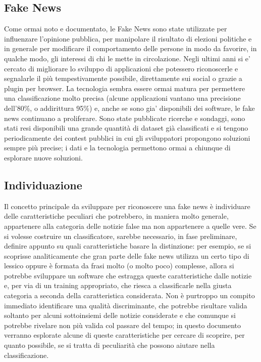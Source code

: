 \documentclass{article}
\begin{document}
    \begin{multicols}{2}
	    \section{Fake News}
			Come ormai noto e documentato, le Fake News sono state utilizzate per influenzare l'opinione pubblica, per manipolare il risultato di elezioni politiche e in generale per modificare il comportamento delle persone in modo da favorire, in qualche modo, gli interessi di chi le mette in circolazione.
			Negli ultimi anni si e' cercato di migliorare lo sviluppo di applicazioni che potessero riconoscerle e segnalarle il più tempestivamente possibile, direttamente sui social o grazie a plugin per browser. La tecnologia sembra essere ormai matura per permettere una classificazione molto precisa (alcune applicazioni vantano una precisione dell'80\%, o addirittura 95\%) \cite{fakenewschallenge} e, anche se sono gia' disponibili dei software, le fake news continuano a proliferare.
			Sono state pubblicate ricerche e sondaggi, sono stati resi disponibili una grande quantità di dataset già classificati e si tengono periodicamente dei contest pubblici in cui gli sviluppatori propongono soluzioni sempre più precise; i dati e la tecnologia permettono ormai a chiunque di esplorare nuove soluzioni.
			
			\subsection{Individuazione}
			Il concetto principale da sviluppare per riconoscere una fake news è individuare delle caratteristiche peculiari che potrebbero, in maniera molto generale, appartenere alla categoria delle notizie false ma non appartenere a quelle vere. Se si volesse costruire un classificatore, sarebbe necessario, in fase preliminare, definire appunto su quali caratteristiche basare la distinzione: per esempio, se si scoprisse analiticamente che gran parte delle fake news utilizza un certo tipo di lessico oppure è formata da frasi molto (o molto poco) complesse, allora si potrebbe sviluppare un software che estragga queste caratteristiche dalle notizie e, per via di un training appropriato, che riesca a classificarle nella giusta categoria a seconda della caratteristica considerata.
			Non è purtroppo un compito immediato identificare una qualità discriminante, che potrebbe risultare valida soltanto per alcuni sottoinsiemi delle notizie considerate e che comunque si potrebbe rivelare non più valida col passare del tempo; in questo documento verranno esplorate alcune di queste caratteristiche per cercare di scoprire, per quanto possibile, se si tratta di peculiarità che possono aiutare nella classificazione.
	    

\end{multicols}
\end{document}
